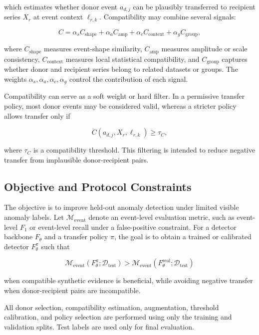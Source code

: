 \documentclass[conference]{IEEEtran}
\begin{document}
which estimates whether donor event $a_{d,j}$ can be plausibly transferred to recipient series $X_r$ at event context $\ell_{r,k}$. Compatibility may combine several signals:

\[
C
=
\alpha_s C_{\mathrm{shape}}
+
\alpha_a C_{\mathrm{amp}}
+
\alpha_c C_{\mathrm{context}}
+
\alpha_g C_{\mathrm{group}},
\]

where $C_{\mathrm{shape}}$ measures event-shape similarity, $C_{\mathrm{amp}}$ measures amplitude or scale consistency, $C_{\mathrm{context}}$ measures local statistical compatibility, and $C_{\mathrm{group}}$ captures whether donor and recipient series belong to related datasets or groups. The weights $\alpha_s,\alpha_a,\alpha_c,\alpha_g$ control the contribution of each signal.

Compatibility can serve as a soft weight or hard filter. In a permissive transfer policy, most donor events may be considered valid, whereas a stricter policy allows transfer only if

\[
C(a_{d,j},X_r,\ell_{r,k}) \geq \tau_C,
\]

where $\tau_C$ is a compatibility threshold. This filtering is intended to reduce negative transfer from implausible donor-recipient pairs.


\subsection{Objective and Protocol Constraints}

The objective is to improve held-out anomaly detection under limited visible
anomaly labels. Let $\mathcal{M}_{\mathrm{event}}$ denote an event-level
evaluation metric, such as event-level $F_1$ or event-level recall under a
false-positive constraint. For a detector backbone $F_\theta$ and a transfer
policy $\pi$, the goal is to obtain a trained or calibrated detector
$F_{\theta}^{\pi}$ such that

\[
\mathcal{M}_{\mathrm{event}}(F_{\theta}^{\pi};\mathcal{D}_{\mathrm{test}})
>
\mathcal{M}_{\mathrm{event}}(F_{\theta}^{\mathrm{real}};\mathcal{D}_{\mathrm{test}})
\]

when compatible synthetic evidence is beneficial, while avoiding negative
transfer when donor-recipient pairs are incompatible.

All donor selection, compatibility estimation, augmentation, threshold
calibration, and policy selection are performed using only the training and
validation splits. Test labels are used only for final evaluation.
\end{document}
